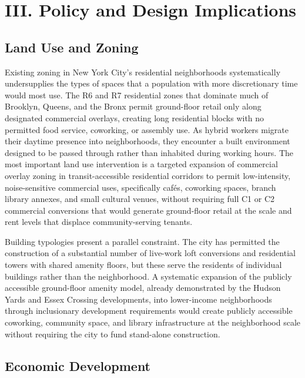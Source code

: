 \documentclass[10pt, twocolumn]{article}
\begin{document}
\section*{III. Policy and Design Implications}

\subsection*{Land Use and Zoning}

Existing zoning in New York City's residential neighborhoods systematically undersupplies the types of spaces that a population with more discretionary time would most use. The R6 and R7 residential zones that dominate much of Brooklyn, Queens, and the Bronx permit ground-floor retail only along designated commercial overlays, creating long residential blocks with no permitted food service, coworking, or assembly use. As hybrid workers migrate their daytime presence into neighborhoods, they encounter a built environment designed to be passed through rather than inhabited during working hours. The most important land use intervention is a targeted expansion of commercial overlay zoning in transit-accessible residential corridors to permit low-intensity, noise-sensitive commercial uses, specifically cafés, coworking spaces, branch library annexes, and small cultural venues, without requiring full C1 or C2 commercial conversions that would generate ground-floor retail at the scale and rent levels that displace community-serving tenants.

Building typologies present a parallel constraint. The city has permitted the construction of a substantial number of live-work loft conversions and residential towers with shared amenity floors, but these serve the residents of individual buildings rather than the neighborhood. A systematic expansion of the publicly accessible ground-floor amenity model, already demonstrated by the Hudson Yards and Essex Crossing developments, into lower-income neighborhoods through inclusionary development requirements would create publicly accessible coworking, community space, and library infrastructure at the neighborhood scale without requiring the city to fund stand-alone construction.

\subsection*{Economic Development}
\end{document}
